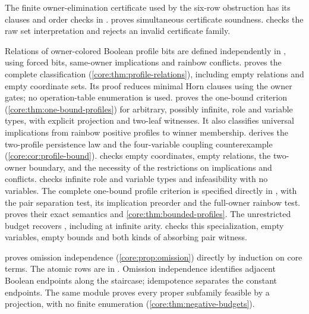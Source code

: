 The finite owner-elimination certificate used by the six-row obstruction
has its clauses and order checks in
.
 proves simultaneous certificate
soundness.  checks the raw set
interpretation and rejects an invalid certificate family.

Relations of owner-colored Boolean profile bits are defined independently in
, using forced bits, same-owner
implications and rainbow conflicts. 
proves the complete classification (\cref{core:thm:profile-relations}),
including empty relations and empty coordinate sets. Its proof reduces
minimal Horn clauses using the owner gates; no operation-table enumeration
is used.
 proves the one-bound criterion
(\cref{core:thm:one-bound-profiles}) for arbitrary, possibly infinite, role
and variable types, with explicit projection and two-leaf witnesses. It also
classifies universal implications from rainbow positive profiles to winner
membership.  derives the two-profile
persistence law and the four-variable coupling counterexample
(\cref{core:cor:profile-bound}). 
checks empty coordinates, empty relations, the two-owner boundary, and the
necessity of the restrictions on implications and conflicts.
 checks infinite role and variable
types and infeasibility with no variables.
The complete one-bound profile criterion is specified directly in
, with the pair separation test,
its implication preorder and the full-owner rainbow test.
 proves their exact semantics and
\cref{core:thm:bounded-profiles}. The unrestricted budget recovers
, including at infinite arity.
 checks this specialization, empty
variables, empty bounds and both kinds of absorbing pair witness.

 proves omission independence
(\cref{core:prop:omission}) directly by induction on core terms.
The atomic rows are in .
Omission independence identifies adjacent Boolean endpoints along the
staircase; idempotence separates the constant endpoints. The same module
proves every proper subfamily feasible by a projection, with no finite
enumeration (\cref{core:thm:negative-budgets}).

